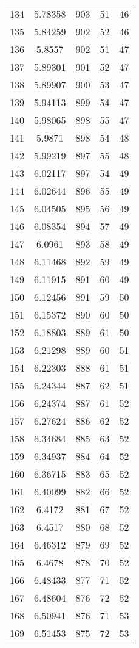 \documentclass[12pt,a4paper]{article}
\begin{document}
\begin{tabular}{r|cccc}
	134 & 5.78358 & 903 & 51 & 46 \\
	135 & 5.84259 & 902 & 52 & 46 \\
	136 & 5.8557 & 902 & 51 & 47 \\
	137 & 5.89301 & 901 & 52 & 47 \\
	138 & 5.89907 & 900 & 53 & 47 \\
	139 & 5.94113 & 899 & 54 & 47 \\
	140 & 5.98065 & 898 & 55 & 47 \\
	141 & 5.9871 & 898 & 54 & 48 \\
	142 & 5.99219 & 897 & 55 & 48 \\
	143 & 6.02117 & 897 & 54 & 49 \\
	144 & 6.02644 & 896 & 55 & 49 \\
	145 & 6.04505 & 895 & 56 & 49 \\
	146 & 6.08354 & 894 & 57 & 49 \\
	147 & 6.0961 & 893 & 58 & 49 \\
	148 & 6.11468 & 892 & 59 & 49 \\
	149 & 6.11915 & 891 & 60 & 49 \\
	150 & 6.12456 & 891 & 59 & 50 \\
	151 & 6.15372 & 890 & 60 & 50 \\
	152 & 6.18803 & 889 & 61 & 50 \\
	153 & 6.21298 & 889 & 60 & 51 \\
	154 & 6.22303 & 888 & 61 & 51 \\
	155 & 6.24344 & 887 & 62 & 51 \\
	156 & 6.24374 & 887 & 61 & 52 \\
	157 & 6.27624 & 886 & 62 & 52 \\
	158 & 6.34684 & 885 & 63 & 52 \\
	159 & 6.34937 & 884 & 64 & 52 \\
	160 & 6.36715 & 883 & 65 & 52 \\
	161 & 6.40099 & 882 & 66 & 52 \\
	162 & 6.4172 & 881 & 67 & 52 \\
	163 & 6.4517 & 880 & 68 & 52 \\
	164 & 6.46312 & 879 & 69 & 52 \\
	165 & 6.4678 & 878 & 70 & 52 \\
	166 & 6.48433 & 877 & 71 & 52 \\
	167 & 6.48604 & 876 & 72 & 52 \\
	168 & 6.50941 & 876 & 71 & 53 \\
	169 & 6.51453 & 875 & 72 & 53 \\

\end{tabular}
\end{document}
